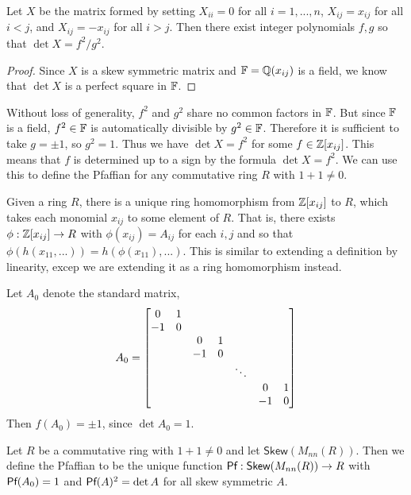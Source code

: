 \begin{lemma}
    Let $X$ be the matrix formed by setting $X_{ii}=0$ for all $i=1,...,n$, $X_{ij}=x_{ij}$ for all $i<j$, and $X_{ij}=-x_{ij}$ for all $i>j$. Then there exist integer polynomials $f,g$ so that $\det X = f^2/g^2$.
\end{lemma}
\begin{proof}
    Since $X$ is a skew symmetric matrix and $\operatorname{\mathbb{F}} = \operatorname{\mathbb{Q}}(x_{ij})$ is a field, we know that $\det X$ is a perfect square in $\operatorname{\mathbb{F}}$.
\end{proof}
\begin{remark*}
    Without loss of generality, $f^2$ and $g^2$ share no common factors in $\operatorname{\mathbb{F}}$. But since $\operatorname{\mathbb{F}}$ is a field, $f^2\in\operatorname{\mathbb{F}}$ is automatically divisible by $g^2\in \operatorname{\mathbb{F}}$. Therefore it is sufficient to take $g = \pm 1$, so $g^2 = 1$. Thus we have $\det X = f^2$ for some $f \in \operatorname{\mathbb{Z}}[x_{ij}]$. This means that $f$ is determined up to a sign by the formula $\det X = f^2$. We can use this to define the Pfaffian for any commutative ring $R$ with $1+1\neq 0$.
\end{remark*}
\begin{remark*}
    Given a ring $R$, there is a unique ring homomorphism from $\operatorname{\mathbb{Z}}[x_{ij}]$ to $R$, which takes each monomial $x_{ij}$ to some element of $R$. That is, there exists $\phi : \operatorname{\mathbb{Z}}[x_{ij}]\to R$ with $\phi(x_{ij}) = A_{ij}$ for each $i,j$ and so that $\phi(h(x_{11},...)) = h(\phi(x_{11}),...)$. This is similar to extending a definition by linearity, excep we are extending it as a ring homomorphism instead.
\end{remark*}
\begin{remark*}
    Let $A_0$ denote the standard matrix,
    \[    A_0 = \begin{bmatrix}
    0&1& & & \\
   -1&0& & \\
     & &0&1& \\
     &&-1&0& \\
     & & & &\ddots \\
     & & & & &0&1\\
     & & & &&-1&0\\
    \end{bmatrix}\]
    Then $f(A_0) = \pm 1$, since $\det A_0 = 1$. 
\end{remark*}
\begin{defn}[Pfaffian]
Let $R$ be a commutative ring with $1+1\neq 0$ and let $\textsf{Skew}(M_{nn}(R))$. Then we define the Pfaffian to be the unique function $\operatorname{\textsf{Pf}} : \textsf{Skew}(M_{nn}(R))\to R$ with $\operatorname{\textsf{Pf}}(A_0) = 1$ and $\operatorname{\textsf{Pf}}(A)^2 = \det A$ for all skew symmetric $A$.
\end{defn}
